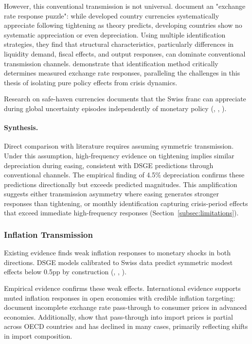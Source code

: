 \documentclass[12pt,a4paper]{article}
\begin{document}
However, this conventional transmission is not universal. \citet{hnatkovska2012} document an "exchange rate response puzzle": while developed country currencies systematically appreciate following tightening as theory predicts, developing countries show no systematic appreciation or even depreciation. Using multiple identification strategies, they find that structural characteristics, particularly differences in liquidity demand, fiscal effects, and output responses, can dominate conventional transmission channels. \citet{bjornland2009} demonstrate that identification method critically determines measured exchange rate responses, paralleling the challenges in this thesis of isolating pure policy effects from crisis dynamics.

Research on safe-haven currencies documents that the Swiss franc can appreciate during global uncertainty episodes independently of monetary policy (\citealt{ranaldo2010}, \citealt{grisse2015}, \citealt{habib2012}). 

\paragraph{Synthesis.}
Direct comparison with literature requires assuming symmetric transmission. Under this assumption, high-frequency evidence on tightening implies similar depreciation during easing, consistent with DSGE predictions through conventional channels. The empirical finding of 4.5\% depreciation confirms these predictions directionally but exceeds predicted magnitudes. This amplification suggests either transmission asymmetry where easing generates stronger responses than tightening, or monthly identification capturing crisis-period effects that exceed immediate high-frequency responses (Section~\ref{subsec:limitations}).

\subsubsection{Inflation Transmission}
Existing evidence finds weak inflation responses to monetary shocks in both 
directions. DSGE models calibrated to Swiss data predict symmetric modest 
effects below 0.5pp by construction (\citealt{cuchecurti2009}, \citealt{rudolf2014}, \citealt{baurle2014}).

Empirical evidence confirms these weak effects. International evidence supports muted inflation responses in open economies with credible inflation targeting: \citet{mccarthy2007} document incomplete exchange rate pass-through to consumer prices in advanced economies. Additionally, \citet{campa2005} show that pass-through into import prices is partial across OECD countries and has declined in many cases, primarily reflecting shifts in import composition.
\end{document}
